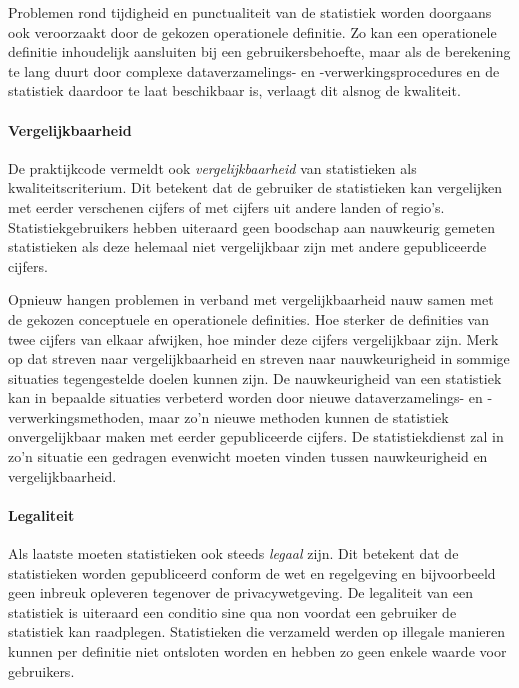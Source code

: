 \documentclass[\mainfiledir/00_handleiding_statistiekproductie.tex]{subfiles}
\begin{document}
Problemen rond tijdigheid en punctualiteit van de statistiek worden doorgaans ook veroorzaakt door de gekozen operationele definitie. Zo kan een operationele definitie inhoudelijk aansluiten bij een gebruikersbehoefte, maar als de berekening te lang duurt door complexe dataverzamelings- en -verwerkingsprocedures en de statistiek daardoor te laat beschikbaar is, verlaagt dit alsnog de kwaliteit.


\paragraph{Vergelijkbaarheid}

De praktijkcode vermeldt ook \emph{vergelijkbaarheid} van statistieken als kwaliteitscriterium. Dit betekent dat de gebruiker de statistieken kan vergelijken met eerder verschenen cijfers of met cijfers uit andere landen of regio's. Statistiekgebruikers hebben uiteraard geen boodschap aan nauwkeurig gemeten statistieken als deze helemaal niet vergelijkbaar zijn met andere gepubliceerde cijfers. 

Opnieuw hangen problemen in verband met vergelijkbaarheid nauw samen met de gekozen conceptuele en operationele definities. Hoe sterker de definities van twee cijfers van elkaar afwijken, hoe minder deze cijfers vergelijkbaar zijn. Merk op dat streven naar vergelijkbaarheid en streven naar nauwkeurigheid in sommige situaties tegengestelde doelen kunnen zijn. De nauwkeurigheid van een statistiek kan in bepaalde situaties verbeterd worden door nieuwe dataverzamelings- en -verwerkingsmethoden, maar zo'n nieuwe methoden kunnen de statistiek onvergelijkbaar maken met eerder gepubliceerde cijfers. De statistiekdienst zal in zo'n situatie een gedragen evenwicht moeten vinden tussen nauwkeurigheid en vergelijkbaarheid. 


\paragraph{Legaliteit}

Als laatste moeten statistieken ook steeds \emph{legaal} zijn. Dit betekent dat de statistieken worden gepubliceerd conform de wet en regelgeving en bijvoorbeeld geen inbreuk opleveren tegenover de privacywetgeving. De legaliteit van een statistiek is uiteraard een conditio sine qua non voordat een gebruiker de statistiek kan raadplegen. Statistieken die verzameld werden op illegale manieren kunnen per definitie niet ontsloten worden en hebben zo geen enkele waarde voor gebruikers. 
\end{document}
